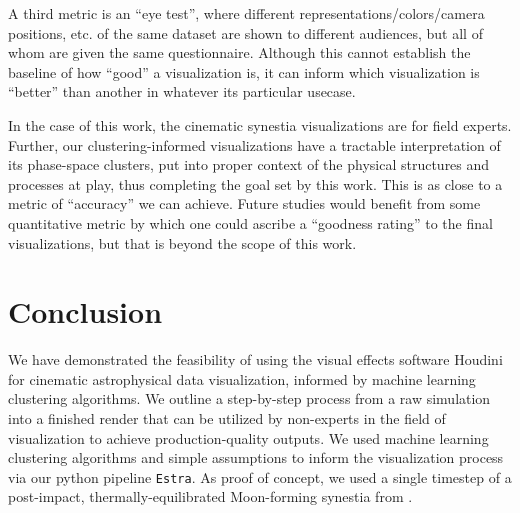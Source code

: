 \documentclass[fleqn,usenatbib,useAMS]{mnras}
\begin{document}
A third metric is an ``eye test'', where different representations/colors/camera positions, etc. of the same dataset are shown to different audiences, but all of whom are given the same questionnaire. Although this cannot establish the baseline of how ``good'' a visualization is, it can inform which visualization is ``better'' than another in whatever its particular usecase. \par

In the case of this work, the cinematic synestia visualizations are for field experts. %
Further, our clustering-informed visualizations have a tractable interpretation of its phase-space clusters, put into proper context of the physical structures and processes at play, thus completing the goal set by this work. This is as close to a metric of ``accuracy'' we can achieve. Future studies would benefit from some quantitative metric by which one could ascribe a ``goodness rating'' to the final visualizations, but that is beyond the scope of this work. \par


\section{Conclusion}\label{sec:Conclusion}

We have demonstrated the feasibility of using the visual effects software Houdini for cinematic astrophysical data visualization, informed by machine learning clustering algorithms. We outline a step-by-step process from a raw simulation into a finished render that can be utilized by non-experts in the field of visualization to achieve production-quality outputs. We used machine learning clustering algorithms and simple assumptions to inform the visualization process via our python pipeline \texttt{Estra}. As proof of concept, we used a single timestep of a post-impact, thermally-equilibrated Moon-forming synestia from \cite{Lock18}. \par
\end{document}
